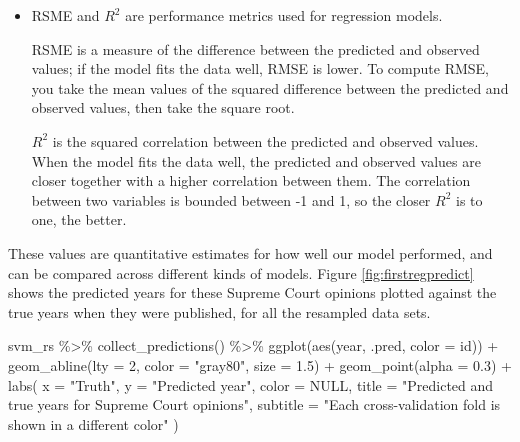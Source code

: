 \documentclass[
]{krantz}
\makeatletter
\newenvironment{Shaded}{\begin{snugshade}}{\end{snugshade}}
\newcommand{\AttributeTok}[1]{\textcolor[rgb]{0.77,0.63,0.00}{#1}}
\newcommand{\ConstantTok}[1]{\textcolor[rgb]{0.00,0.00,0.00}{#1}}
\newcommand{\DecValTok}[1]{\textcolor[rgb]{0.00,0.00,0.81}{#1}}
\newcommand{\FloatTok}[1]{\textcolor[rgb]{0.00,0.00,0.81}{#1}}
\newcommand{\FunctionTok}[1]{\textcolor[rgb]{0.00,0.00,0.00}{#1}}
\newcommand{\NormalTok}[1]{#1}
\newcommand{\SpecialCharTok}[1]{\textcolor[rgb]{0.00,0.00,0.00}{#1}}
\newcommand{\StringTok}[1]{\textcolor[rgb]{0.31,0.60,0.02}{#1}}
\newenvironment{kframe}{%
\medskip{}
\setlength{\fboxsep}{.8em}
 \def\at@end@of@kframe{}%
 \ifinner\ifhmode%
  \def\at@end@of@kframe{\end{minipage}}%
  \begin{minipage}{\columnwidth}%
 \fi\fi%
 \def\FrameCommand##1{\hskip\@totalleftmargin \hskip-\fboxsep
 \colorbox{shadecolor}{##1}\hskip-\fboxsep
     \hskip-\linewidth \hskip-\@totalleftmargin \hskip\columnwidth}%
 \MakeFramed {\advance\hsize-\width
   \@totalleftmargin\z@ \linewidth\hsize
   \@setminipage}}%
 {\par\unskip\endMakeFramed%
 \at@end@of@kframe}
\renewenvironment{Shaded}{\begin{kframe}}{\end{kframe}}
\newenvironment{rmdblock}[1]
  {\begin{shaded*}
  \begin{itemize}[left = -1cm, labelsep = 1cm]
  \renewcommand{\labelitemi}{
    \raisebox{-.7\height}[0pt][0pt]{
      {\setkeys{Gin}{width=3em,keepaspectratio}\texttt{[image: images/\#1]}}
    }
  }
 
  \item
  }
  {
  \end{itemize}
  \end{shaded*}
  }
\newenvironment{rmdnote}
  {\begin{rmdblock}{note}}
  {\end{rmdblock}}
\makeatother
\begin{document}

\begin{rmdnote}
RSME and \(R^2\) are performance metrics used for regression models.

RSME is a measure of the difference between the predicted and observed
values; if the model fits the data well, RMSE is lower. To compute RMSE,
you take the mean values of the squared difference between the predicted
and observed values, then take the square root.

\(R^2\) is the squared correlation between the predicted and observed
values. When the model fits the data well, the predicted and observed
values are closer together with a higher correlation between them. The
correlation between two variables is bounded between -1 and 1, so the
closer \(R^2\) is to one, the better.
\end{rmdnote}

These values are quantitative estimates for how well our model performed, and can be compared across different kinds of models. Figure \ref{fig:firstregpredict} shows the predicted years for these Supreme Court opinions plotted against the true years when they were published, for all the resampled data sets.

\begin{Shaded}
\begin{Highlighting}[]
\NormalTok{svm\_rs }\SpecialCharTok{\%\textgreater{}\%}
  \FunctionTok{collect\_predictions}\NormalTok{() }\SpecialCharTok{\%\textgreater{}\%}
  \FunctionTok{ggplot}\NormalTok{(}\FunctionTok{aes}\NormalTok{(year, .pred, }\AttributeTok{color =}\NormalTok{ id)) }\SpecialCharTok{+}
  \FunctionTok{geom\_abline}\NormalTok{(}\AttributeTok{lty =} \DecValTok{2}\NormalTok{, }\AttributeTok{color =} \StringTok{"gray80"}\NormalTok{, }\AttributeTok{size =} \FloatTok{1.5}\NormalTok{) }\SpecialCharTok{+}
  \FunctionTok{geom\_point}\NormalTok{(}\AttributeTok{alpha =} \FloatTok{0.3}\NormalTok{) }\SpecialCharTok{+}
  \FunctionTok{labs}\NormalTok{(}
    \AttributeTok{x =} \StringTok{"Truth"}\NormalTok{,}
    \AttributeTok{y =} \StringTok{"Predicted year"}\NormalTok{,}
    \AttributeTok{color =} \ConstantTok{NULL}\NormalTok{,}
    \AttributeTok{title =} \StringTok{"Predicted and true years for Supreme Court opinions"}\NormalTok{,}
    \AttributeTok{subtitle =} \StringTok{"Each cross{-}validation fold is shown in a different color"}
\NormalTok{  )}
\end{Highlighting}
\end{Shaded}
\end{document}
